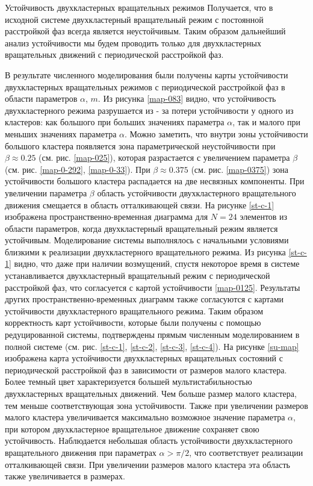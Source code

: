 \begin{chapter}{Устойчивость двухкластерных вращательных режимов}
	Получается, что в исходной системе двухкластерный вращательный режим с постоянной расстройкой фаз всегда является неустойчивым.
	Таким образом дальнейший анализ устойчивости мы будем проводить только для двухкластерных вращательных движений с периодической
	расстройкой фаз.


	В результате численного моделирования были получены карты устойчивости двухкластерных вращательных
	режимов с периодической расстройкой фаз в области параметров $\alpha$, $m$. Из рисунка \ref{map-083} видно, что устойчивость двухкластерного режима разрушается из - за потери устойчивости у одного из кластеров:
	как большого при больших значениях параметра $\alpha$, так и малого при меньших значениях параметра $\alpha$.
	Можно заметить, что внутри зоны устойчивости большого кластера появляется зона параметрической неустойчивости при $\beta \approx 0.25$ (см. рис. \ref{map-025}), которая
	разрастается с увеличением параметра $\beta$ (см. рис. \ref{map-0-292}, \ref{map-0-33}). При $\beta \approx 0.375$ (см. рис. \ref{map-0375}) зона устойчивости большого кластера
	распадается на две несвязных компоненты. При увеличении параметра $\beta$ область устойчивости двухкластерного вращательного движения смещается в область отталкивающей связи.
	На рисунке \ref{st-c-1} изображена пространственно-временная диаграмма для $N = 24$ элементов из области параметров, когда
	двухкластерный вращательный режим является устойчивым. Моделирование системы выполнялось с начальными условиями 
	близкими к реализации двухкластерного вращательного режима. Из рисунка \ref{st-c-1} видно, что даже при наличии возмущений,
	спустя некоторое время в системе устанавливается двухкластерный вращательный режим с периодической расстройкой фаз, что согласуется с
	картой устойчивости \ref{map-0125}. Результаты других пространственно-временных диаграмм также согласуются с картами устойчивости двухкластерного вращательного режима.
	Таким образом корректность карт устойчивости, которые были получены с помощью редуцированной системы, подтверждены прямым численным моделированием в полной системе (см. рис. \ref{st-c-1}, \ref{st-c-2}, \ref{st-c-3}, \ref{st-c-4}).
	На рисунке \ref{su-map} изображена карта устойчивости двухкластерных вращательных состояний с
	периодической расстройкой фаз в зависимости от размеров малого кластера. Более темный цвет
	характеризуется большей мультистабильностью двухкластерных вращательных движений.
	Чем больше размер малого кластера, тем меньше соответствующая
	зона устойчивости. Также при увеличении размеров малого кластера увеличивается максимально возможное значение параметра
	$\alpha$, при котором двухкластерное вращательное движение сохраняет свою устойчивость.
	Наблюдается небольшая область устойчивости двухкластерного вращательного движения при параметрах $\alpha > \pi/2$, что соответствует
	реализации отталкивающей связи. При увеличении размеров малого кластера эта область также увеличивается в размерах.


\end{chapter}
